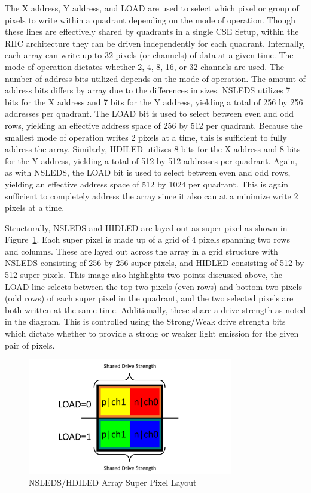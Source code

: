     The X address, Y address, and LOAD are used to select which pixel or group of pixels to write within a quadrant depending on the mode of operation. Though these lines are effectively shared by quadrants in a single CSE Setup, within the RIIC architecture they can be driven independently for each quadrant. Internally, each array can write up to 32 pixels (or channels) of data at a given time. The mode of operation dictates whether 2, 4, 8, 16, or 32 channels are used. The number of address bits utilized depends on the mode of operation. The amount of address bits differs by array due to the differences in sizes. NSLEDS utilizes 7 bits for the X address and 7 bits for the Y address, yielding a total of 256 by 256 addresses per quadrant. The LOAD bit is used to select between even and odd rows, yielding an effective address space of 256 by 512 per quadrant. Because the smallest mode of operation writes 2 pixels at a time, this is sufficient to fully address the array. Similarly, HDILED utilizes 8 bits for the X address and 8 bits for the Y address, yielding a total of 512 by 512 addresses per quadrant. Again, as with NSLEDS, the LOAD bit is used to select between even and odd rows, yielding an effective address space of 512 by 1024 per quadrant. This is again sufficient to completely address the array since it also can at a minimize write 2 pixels at a time.

    Structurally, NSLEDS and HIDLED are layed out as super pixel as shown in Figure~\ref{fig:nsleds_hdiled_array_superpixel_layout}. Each super pixel is made up of a grid of 4 pixels spanning two rows and columns. These are layed out across the array in a grid structure with NSLEDS consisting of 256 by 256 super pixels, and HIDLED consisting of 512 by 512 super pixels. This image also highlights two points discussed above, the LOAD line selects between the top two pixels (even rows) and bottom two pixels (odd rows) of each super pixel in the quadrant, and the two selected pixels are both written at the same time. Additionally, these share a drive strength as noted in the diagram. This is controlled using the Strong/Weak drive strength bits which dictate whether to provide a strong or weaker light emission for the given pair of pixels.

    \begin{figure}
        \centering
        \includegraphics[trim=0in 0in 0in 0in,width=0.8\textwidth]{fig/superpixel_layout.pdf}
        \caption{NSLEDS/HDILED Array Super Pixel Layout}
        \label{fig:nsleds_hdiled_array_superpixel_layout}
    \end{figure}

